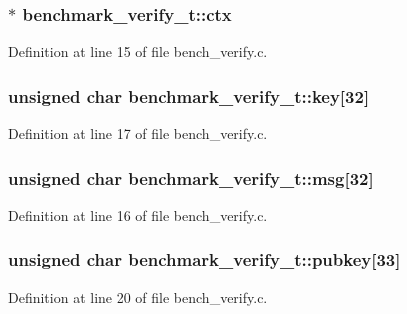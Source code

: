 \subsubsection[{ctx}]{$\ast$ benchmark\+\_\+verify\+\_\+t\+::ctx}\label{structbenchmark__verify__t_ac4e3488929ce883255241ef451b8c9ad}


Definition at line 15 of file bench\+\_\+verify.\+c.

\hypertarget{structbenchmark__verify__t_acdc2cf6f21a2aa51036585bd93fe11fc}{}
\subsubsection[{key}]{\setlength{\rightskip}{0pt plus 5cm}unsigned char benchmark\+\_\+verify\+\_\+t\+::key\mbox{[}32\mbox{]}}\label{structbenchmark__verify__t_acdc2cf6f21a2aa51036585bd93fe11fc}


Definition at line 17 of file bench\+\_\+verify.\+c.

\hypertarget{structbenchmark__verify__t_a5941066c834af80d568078780c2d69d7}{}
\subsubsection[{msg}]{\setlength{\rightskip}{0pt plus 5cm}unsigned char benchmark\+\_\+verify\+\_\+t\+::msg\mbox{[}32\mbox{]}}\label{structbenchmark__verify__t_a5941066c834af80d568078780c2d69d7}


Definition at line 16 of file bench\+\_\+verify.\+c.

\hypertarget{structbenchmark__verify__t_af79770b187ad7a6dd6bc816682e02a8c}{}
\subsubsection[{pubkey}]{\setlength{\rightskip}{0pt plus 5cm}unsigned char benchmark\+\_\+verify\+\_\+t\+::pubkey\mbox{[}33\mbox{]}}\label{structbenchmark__verify__t_af79770b187ad7a6dd6bc816682e02a8c}


Definition at line 20 of file bench\+\_\+verify.\+c.

